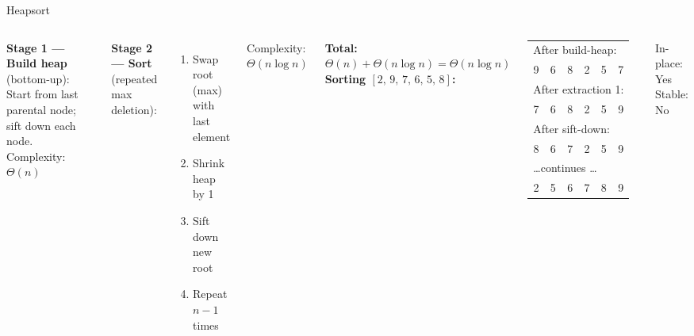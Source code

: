 \documentclass[aspectratio=169]{beamer}
\begin{document}
\begin{frame}[shrink=12]{Heapsort}
  \begin{columns}[T]
      \textbf{Stage 1 — Build heap} (bottom-up):
      Start from last parental node; sift down each node.
      Complexity: $\Theta(n)$

      \vspace{0.3em}
      \textbf{Stage 2 — Sort} (repeated max deletion):
      \begin{enumerate}
        \item Swap root (max) with last element
        \item Shrink heap by 1
        \item Sift down new root
        \item Repeat $n-1$ times
      \end{enumerate}
      Complexity: $\Theta(n\log n)$

      \vspace{0.3em}
      \textbf{Total:} $\Theta(n) + \Theta(n\log n) = \Theta(n\log n)$
      \textbf{Sorting $[2,\,9,\,7,\,6,\,5,\,8]$:}
      \vspace{0.2em}

      \begin{tabular}{cccccc}
        \multicolumn{6}{l}{\scriptsize After build-heap:} \\
        \rowcolor{PrimaryLight!40}
        9&6&8&2&5&7 \\[2pt]
        \multicolumn{6}{l}{\scriptsize After extraction 1:} \\
        \rowcolor{white}
        7&6&8&2&5&\cellcolor{SuccessGreen!20}9 \\[2pt]
        \multicolumn{6}{l}{\scriptsize After sift-down:} \\
        \rowcolor{PrimaryLight!40}
        8&6&7&2&5&\cellcolor{SuccessGreen!20}9 \\[2pt]
        \multicolumn{6}{l}{\scriptsize \ldots continues \ldots} \\
        \rowcolor{SuccessGreen!20}
        2&5&6&7&8&9 \\
      \end{tabular}
      \vspace{0.3em}
      In-place: \textcolor{SuccessGreen}{Yes} \quad Stable: \alert{No}
  \end{columns}
\end{frame}

\end{document}
